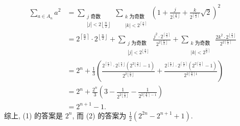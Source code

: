 $$
\begin{aligned}
\sum_{a \in A_n} a^2 & =\sum_{\substack{j \text { 奇数 } \\
|j|<2\left\lfloor\frac{n}{2}\right\rfloor}} \sum_{\substack{k \text { 为奇数 } \\
|k|<2^{\left\lceil\frac{n}{2}\right\rceil}}}\left(1+\frac{j}{2^{\left\lfloor\frac{n}{2}\right\rfloor}}+\frac{k}{2^{\left\lceil\frac{n}{2}\right\rceil}} \sqrt{2}\right)^2 \\
& =2^{\left\lceil\frac{n}{2}\right\rceil} \cdot 2^{\left\lfloor\frac{n}{2}\right\rfloor}+\sum_{\substack{j \text { 为奇数 } \\
|j|<2^{\left\lfloor\frac{n}{2}\right\rfloor}}} \frac{j^2 \cdot 2^{\left\lceil\frac{n}{2}\right\rceil}}{2^{2\left\lfloor\frac{n}{2}\right\rfloor}}+\sum_{\substack{k \text { 为奇数 } \\
|k|<2^{\left.\frac{n}{2}\right\rceil}}} \frac{2 k^2 \cdot 2^{\left\lfloor\frac{n}{2}\right\rfloor}}{2^{2\left\lceil\frac{n}{2}\right\rceil}} \\
& =2^n+\frac{1}{3}\left(\frac{2^{\left\lceil\frac{n}{2}\right\rceil} \cdot 2^{\left\lfloor\frac{n}{2}\right\rfloor}\left(2^{2\left\lfloor\frac{n}{2}\right\rfloor}-1\right)}{2^{2\left\lfloor\frac{n}{2}\right\rfloor}}+\frac{2^{\left\lfloor\frac{n}{2}\right\rfloor} \cdot 2^{\left\lceil\frac{n}{2}\right\rceil}\left(2^{2\left\lceil\frac{n}{2}\right\rceil}-1\right)}{2^{2\left\lceil\frac{n}{2}\right\rceil 1}}\right) \\
& =2^n+\frac{2^n}{3}\left(3-\frac{1}{2^{2\left\lfloor\frac{n}{2}\right\rfloor}}-\frac{1}{2^{2\left\lceil\frac{n}{2}\right\rceil-1}}\right) \\
& =2^{n+1}-1 .
\end{aligned}
$$
综上, (1) 的答案是 $2^n$, 而 (2) 的答案为 $\frac{1}{2}\left(2^{2 n}-2^{n+1}+1\right)$.



